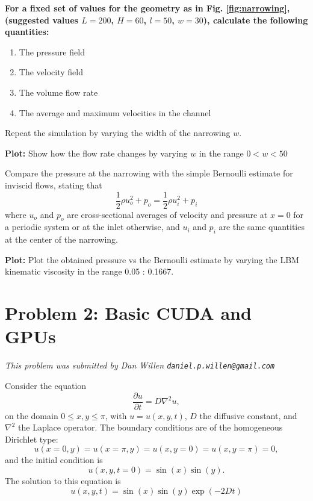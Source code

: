 \documentclass[11pt]{article}
\begin{document}

    
    \textbf{For a fixed set of values for the geometry 
    as in Fig. \ref{fig:narrowing}, (suggested values $L=200$, $H=60$, $l=50$, $w=30$), 
    calculate the following quantities:}
    \begin{enumerate}
      \item The pressure field
      \item The velocity field 
      \item The volume flow rate 
      \item The average and maximum velocities in the channel
    \end{enumerate}



    Repeat the simulation by varying the width of the narrowing $w$.


    \textbf{Plot:}
    Show how the flow rate changes by varying $w$ in the range $0<w<50$



    Compare the pressure at the narrowing with the simple Bernoulli estimate for inviscid flows, stating that
    $$
    \frac{1}{2} \rho u_o^2 + p_o = \frac{1}{2} \rho u_i^2 + p_i
    $$
    where $u_o$ and $p_o$ are cross-sectional averages of velocity and pressure at $x=0$ for a periodic system 
    or at the inlet otherwise, and $u_i$ and $p_i$ are the same quantities at the center of the narrowing. 
    
    \textbf{Plot:}
    Plot the obtained pressure vs the Bernoulli estimate by varying the LBM kinematic viscosity in the range 0.05 : 0.1667.





  \section{Problem 2:  Basic CUDA and GPUs}
    \textit{This problem was submitted by Dan Willen \texttt{daniel.p.willen@gmail.com}}

    Consider the equation
    \begin{equation}\label{eq:heat}
      \frac{\partial u}{\partial t} = D \nabla^2 u,
    \end{equation}
    on the domain \(0 \leq x,y \leq \pi\), with \(u = u(x,y,t)\), \(D\) the diffusive constant, and \(\nabla^2\) the Laplace operator.
    The boundary conditions are of the homogeneous Dirichlet type:
    \begin{equation}
      u(x = 0, y) = u(x = \pi, y) = u(x, y = 0) = u(x, y = \pi) = 0,
    \end{equation}
    and the initial condition is
    \begin{equation}
      u(x,y, t = 0) = \sin(x) \sin(y).
    \end{equation}
    The solution to this equation is
    \begin{equation}
      u(x,y,t) = \sin(x) \sin(y) \exp{(-2Dt)}
    \end{equation}
    
\end{document}

